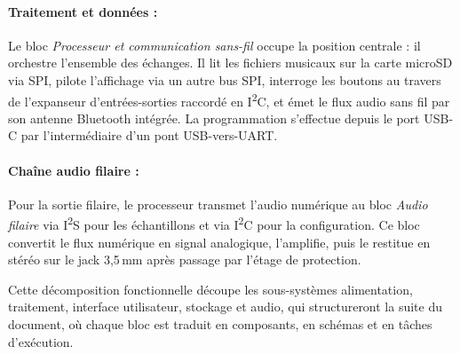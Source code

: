 \paragraph{Traitement et données :} Le bloc \emph{Processeur et communication sans-fil} occupe la position centrale : il orchestre l'ensemble des échanges. Il lit les fichiers musicaux sur la carte microSD via SPI, pilote l'affichage via un autre bus SPI, interroge les boutons au travers de l'expanseur d'entrées-sorties raccordé en I\textsuperscript{2}C, et émet le flux audio sans fil par son antenne Bluetooth intégrée. La programmation s'effectue depuis le port USB-C par l'intermédiaire d'un pont USB-vers-UART.

\paragraph{Chaîne audio filaire :} Pour la sortie filaire, le processeur transmet l'audio numérique au bloc \emph{Audio filaire} via I\textsuperscript{2}S pour les échantillons et via I\textsuperscript{2}C pour la configuration. Ce bloc convertit le flux numérique en signal analogique, l'amplifie, puis le restitue en stéréo sur le jack 3,5\,mm après passage par l'étage de protection.


Cette décomposition fonctionnelle découpe les sous-systèmes alimentation, traitement, interface utilisateur, stockage et audio, qui structureront la suite du document, où chaque bloc est traduit en composants, en schémas et en tâches d'exécution.